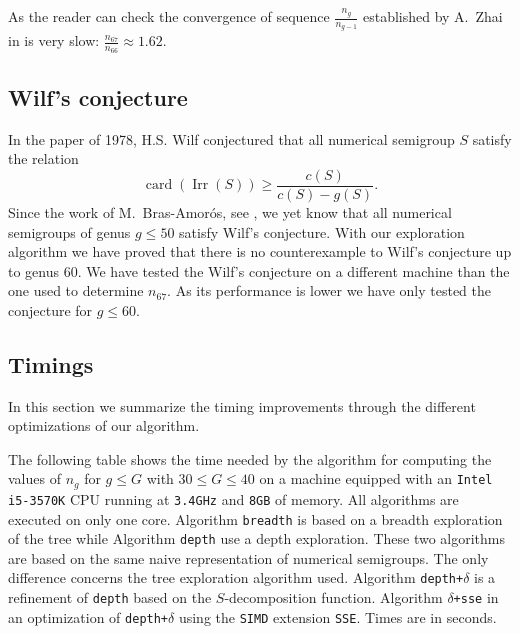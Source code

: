 \documentclass[reqno]{amsart}
\theoremstyle{plain}
\theoremstyle{definition}
\renewcommand{\leq}{\leqslant}
\renewcommand{\geq}{\geqslant}
\newcommand{\SIMD}{\texttt{SIMD}\xspace}
\newcommand{\SSE}{\texttt{SSE}\xspace}
\renewcommand{\tt}[1]{\texttt{#1}}
\DeclareMathOperator{\Irr}{Irr}
\DeclareMathOperator{\card}{card}
\begin{document}
As the reader can check the convergence of sequence $\frac{n_g}{n_{g-1}}$ established by A.~Zhai in \cite{Zhai} is very slow: $\frac{n_{67}}{n_{66}}\approx 1.62$.


\subsection{Wilf's conjecture}

In the paper \cite{Wilf} of 1978, H.S. Wilf conjectured that all numerical semigroup $S$ satisfy the relation 
\[
\card(\Irr(S))\geq \frac{c(S)}{c(S)-g(S)}.
\]
Since the work of M.~Bras-Amor{\'o}s, see \cite{BrasAmoros2008}, we yet know that all numerical semigroups of genus $g\leq 50$ satisfy Wilf's conjecture. With our exploration algorithm we have proved that there is no counterexample to Wilf's conjecture up to genus $60$.
We have tested the Wilf's conjecture on a different machine than the one used to determine $n_{67}$.
As its performance is lower we have only tested the conjecture for $g\leq 60$. 

\subsection{Timings}

In this section we summarize the timing improvements through the different 
optimizations of our algorithm. 


The following table shows the time needed by the algorithm for computing 
the values of $n_g$ 
for $g\leq G$ with $30\leq G \leq 40$
on a machine equipped with  an \tt{Intel\texttrademark{} i5-3570K} CPU running at \texttt{3.4GHz}
and \texttt{8GB} of memory.
All algorithms are executed on only one core. Algorithm \texttt{breadth} is 
based on a breadth exploration of the tree while Algorithm \texttt{depth} 
use a depth exploration. 
These two algorithms are based on the same naive representation of numerical semigroups.
The only difference concerns the tree exploration algorithm used.
Algorithm \texttt{depth+$\delta$} is a refinement of 
\texttt{depth} based on the $S$-decomposition function. Algorithm 
\texttt{$\delta$+sse} in an optimization of \texttt{depth+$\delta$} using the 
\SIMD extension \SSE. Times are in seconds.

\vspace{1em}
\end{document}
